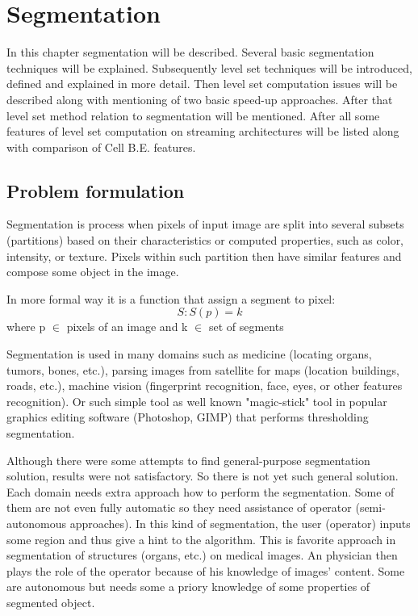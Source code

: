 \chapter{Segmentation}

In this chapter segmentation will be described. Several basic segmentation techniques will be explained.
Subsequently level set techniques will be introduced, defined and explained in more detail.
Then level set computation issues will be described along with mentioning of two basic speed-up approaches.
After that level set method relation to segmentation will be mentioned.
After all some features of level set computation on streaming architectures will be listed along with comparison of Cell B.E. features.

\section{Problem formulation}
Segmentation is process when pixels of input image are split into several subsets (partitions) based on their characteristics or computed properties, such as color, intensity, or texture.
Pixels within such partition then have similar features and compose some object in the image.

In more formal way it is a function that assign a segment to pixel:
\begin{equation}
S: S(p) = k
\end{equation}
where p $\in$ pixels of an image and k $\in$ set of segments

Segmentation is used in many domains such as medicine (locating organs, tumors, bones, etc.), parsing images from satellite for maps (location buildings, roads, etc.), machine vision (fingerprint recognition, face, eyes, or other features recognition).
Or such simple tool as well known "magic-stick" tool in popular graphics editing software (Photoshop, GIMP) that performs thresholding segmentation.

Although there were some attempts to find general-purpose segmentation solution, results were not satisfactory.
So there is not yet such general solution. Each domain needs extra approach how to perform the segmentation.
Some of them are not even fully automatic so they need assistance of operator (semi-autonomous approaches).
In this kind of segmentation, the user (operator) inputs some region and thus give a hint to the algorithm.
This is favorite approach in segmentation of structures (organs, etc.) on medical images.
An physician then plays the role of the operator because of his knowledge of images' content.
Some are autonomous but needs some a priory knowledge of some properties of segmented object.

